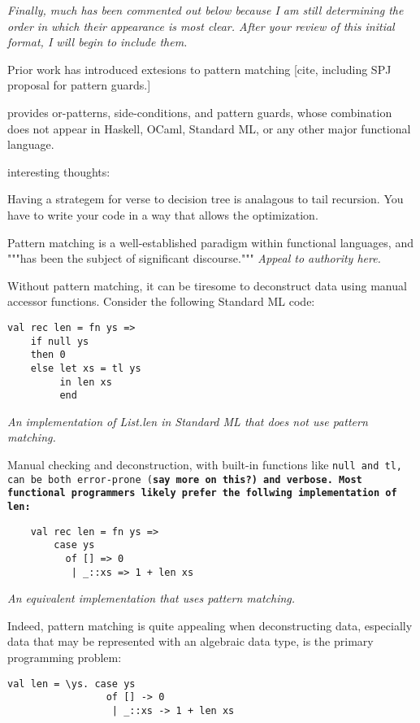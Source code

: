 \documentclass[manuscript,screen,review, 12pt]{acmart}
\begin{document}
\it{Finally, much has been commented out below because I am still determining
    the order in which their appearance is most clear. After your review of this
    initial format, I will begin to include them.}


Prior work has introduced extesions to pattern matching [cite, including
SPJ proposal for pattern guards.]

{\PPlus} provides or-patterns, side-conditions, and pattern guards, whose
combination does not appear in Haskell, OCaml, Standard ML, or any other major
functional language. 

\bigskip
interesting thoughts: 

Having a strategem for verse to decision tree is analagous to tail recursion. 
You have to write your code in a way that allows the optimization. 


Pattern matching is a well-established paradigm within functional languages, and
"""has been the subject of significant discourse.""" \it{Appeal to authority here.}

Without pattern matching, it can be tiresome to deconstruct data using manual 
accessor functions. Consider the following Standard ML code: 
\smllst

\begin{lstlisting}
val rec len = fn ys => 
    if null ys 
    then 0 
    else let xs = tl ys 
         in len xs 
         end 
\end{lstlisting}
\it{An implementation of List.len in Standard ML that does not use pattern 
    matching.}

Manual checking and deconstruction, with built-in functions like \tt{null} and
\tt{tl}, can be both error-prone (\bf{say more on this?}) and verbose. Most
functional programmers likely prefer the follwing implementation of \tt{len}:

\begin{lstlisting}
    val rec len = fn ys => 
        case ys 
          of [] => 0
           | _::xs => 1 + len xs
    \end{lstlisting}

\it{An equivalent implementation that uses pattern matching.}

Indeed, pattern matching is quite appealing when deconstructing data, especially 
data that may be represented with an algebraic data type, is the primary programming problem: 



\begin{lstlisting}
val len = \ys. case ys 
                 of [] -> 0
                  | _::xs -> 1 + len xs
\end{lstlisting}
\end{document}
